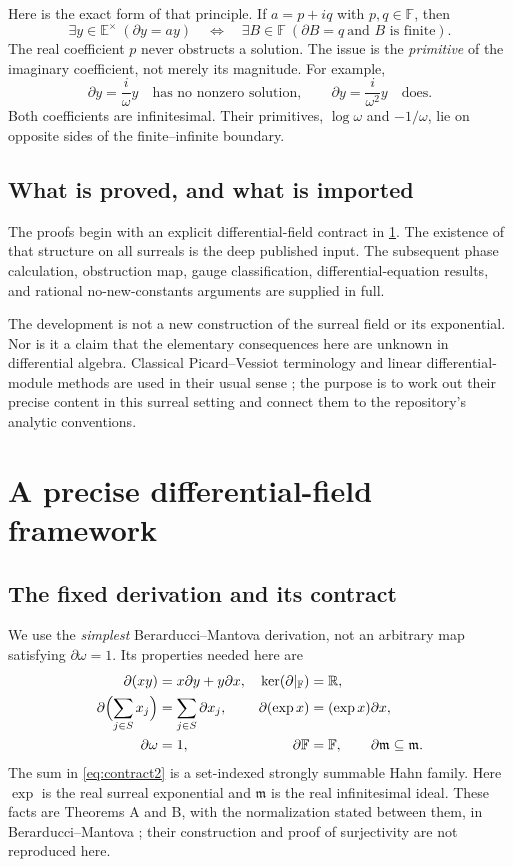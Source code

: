 \documentclass[11pt,a4paper]{article}
\numberwithin{equation}{section}
\theoremstyle{definition}
\theoremstyle{remark}
\newcommand{\F}{\mathbb F}
\newcommand{\E}{\mathbb E}
\newcommand{\R}{\mathbb R}
\newcommand{\mm}{\mathfrak m}
\newcommand{\D}{\partial}
\begin{document}
Here is the exact form of that principle. If $a=p+iq$ with $p,q\in\F$, then
\begin{equation}\label{eq:opening}
 \exists y\in\E^{\times}\ (\D y=ay)
 \quad\Longleftrightarrow\quad
 \exists B\in\F\ (\D B=q\ \text{and }B\text{ is finite}).
\end{equation}
The real coefficient $p$ never obstructs a solution. The issue is the
\emph{primitive} of the imaginary coefficient, not merely its magnitude.
For example,
\[
 \D y=\frac{i}{\omega}y \quad\text{has no nonzero solution},\qquad
 \D y=\frac{i}{\omega^2}y \quad\text{does}.
\]
Both coefficients are infinitesimal. Their primitives, $\log\omega$ and
$-1/\omega$, lie on opposite sides of the finite--infinite boundary.

\subsection{What is proved, and what is imported}
The proofs begin with an explicit differential-field contract in
\cref{sec:framework}. The existence of that structure on all surreals is the
deep published input. The subsequent phase calculation, obstruction map,
gauge classification, differential-equation results, and rational
no-new-constants arguments are supplied in full.

The development is not a new construction of the surreal field or its
exponential. Nor is it a claim that the elementary consequences here are
unknown in differential algebra. Classical Picard--Vessiot terminology and
linear differential-module methods are used in their usual sense
\cite{PS}; the purpose is to work out their precise content in this surreal
setting and connect them to the repository's analytic conventions.

\section{A precise differential-field framework}\label{sec:framework}

\subsection{The fixed derivation and its contract}
We use the \emph{simplest} Berarducci--Mantova derivation, not an arbitrary
map satisfying $\D\omega=1$. Its properties needed here are
\begin{align}
 \D(xy)&=x\D y+y\D x, & \ker(\D|_{\F})&=\R,\label{eq:contract1}\\
 \D\Bigl(\sum_{j\in S}x_j\Bigr)&=\sum_{j\in S}\D x_j,
 &\D(\exp x)&=(\exp x)\D x,\label{eq:contract2}\\
 \D\omega&=1, &\D\F&=\F,\qquad \D\mm\subseteq\mm.\label{eq:contract3}
\end{align}
The sum in \eqref{eq:contract2} is a set-indexed strongly summable Hahn
family. Here $\exp$ is the real surreal exponential and $\mm$ is the real infinitesimal ideal. These facts are
Theorems A and B, with the normalization stated between them, in
Berarducci--Mantova \cite{BM}; their construction and proof of surjectivity
are not reproduced here.
\end{document}
